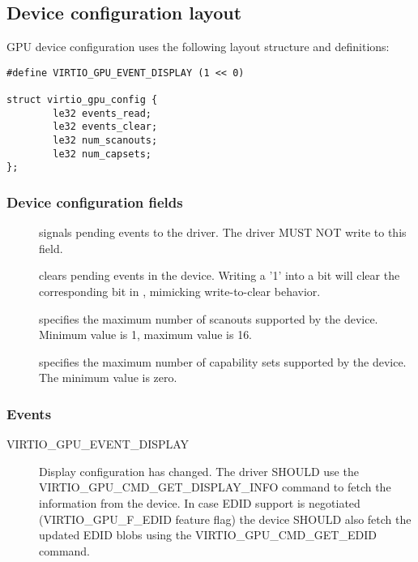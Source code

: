 \subsection{Device configuration layout}\label{sec:Device Types / GPU Device / Device configuration layout}

GPU device configuration uses the following layout structure and
definitions:

\begin{lstlisting}
#define VIRTIO_GPU_EVENT_DISPLAY (1 << 0)

struct virtio_gpu_config {
        le32 events_read;
        le32 events_clear;
        le32 num_scanouts;
        le32 num_capsets;
};
\end{lstlisting}

\subsubsection{Device configuration fields}

\begin{description}
\item[] signals pending events to the driver.  The
  driver MUST NOT write to this field.
\item[] clears pending events in the device.
  Writing a '1' into a bit will clear the corresponding bit in
  , mimicking write-to-clear behavior.
\item[] specifies the maximum number of scanouts
  supported by the device.  Minimum value is 1, maximum value is 16.
\item[] specifies the maximum number of capability
  sets supported by the device.  The minimum value is zero.
\end{description}

\subsubsection{Events}

\begin{description}
\item[VIRTIO_GPU_EVENT_DISPLAY] Display configuration has changed.
  The driver SHOULD use the VIRTIO_GPU_CMD_GET_DISPLAY_INFO command to
  fetch the information from the device.  In case EDID support is
  negotiated (VIRTIO_GPU_F_EDID feature flag) the device SHOULD also
  fetch the updated EDID blobs using the VIRTIO_GPU_CMD_GET_EDID
  command.
\end{description}

